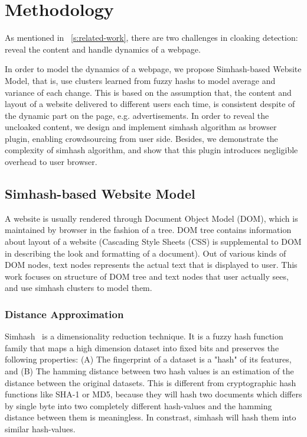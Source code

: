 \section{Methodology}
\label{s:methodology}
As mentioned in ~\autoref{s:related-work}, there are two challenges in cloaking
detection: reveal the content and handle dynamics of a webpage.

In order to model the dynamics of a webpage, we propose Simhash-based Website
Model, that is, use clusters learned from fuzzy hashs to model average and
variance of each change. This is based on the assumption that, the content and
layout of a website delivered to different users each time, is consistent
despite of the dynamic part on the page, e.g. advertisements. In order to reveal
the uncloaked content, we design and implement simhash algorithm as browser
plugin, enabling crowdsourcing from user side.
Besides, we demonstrate the complexity of simhash algorithm, and show
that this plugin introduces negligible overhead to user browser.

\subsection{Simhash-based Website Model}
A website is usually rendered through Document
Object Model (DOM), which is maintained by browser in the fashion of a tree.
DOM tree contains information about layout of a website (Cascading Style
Sheets (CSS) is supplemental to DOM in describing the look and
formatting of a document). Out of various kinds of DOM nodes,  text nodes
represents the actual text that is displayed to user. This work focuses on
structure of DOM tree and text nodes that user actually sees, and use simhash
clusters to model them.


\subsubsection{Distance Approximation}
Simhash~\cite{charikar2002similarity} is a dimensionality reduction technique.
It is a fuzzy hash function family that maps a high dimension dataset into fixed
bits and preserves the following properties: 
(A) The fingerprint of a dataset is a "hash" of its features, and (B) The
hamming distance between two hash values is an estimation of the distance
between the original datasets.
This is different from 
cryptographic hash functions like SHA-1 or MD5, because they will hash two
documents which differs by single byte into two completely different hash-values and the
hamming distance between them is meaningless. 
In constrast, simhash will hash them into similar hash-values.

